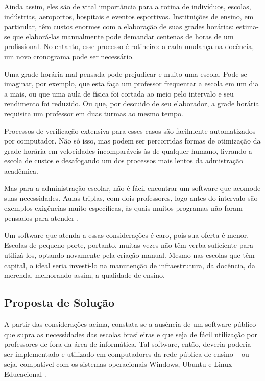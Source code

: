 \documentclass[12pt,a4paper]{article}
\begin{document}
			\par Ainda assim, eles são de vital importância para a rotina de indivíduos, escolas, indústrias, aeroportos, hospitais e eventos esportivos. Instituições de ensino, em particular, têm custos enormes com a elaboração de suas grades horárias: estima-se que elaborá-las manualmente pode demandar centenas de horas \cite{appleby} de um profissional. No entanto, esse processo é rotineiro: a cada mudança na docência, um novo cronograma pode ser necessário.

			\par Uma grade horária mal-pensada pode prejudicar e muito uma escola. Pode-se imaginar, por exemplo, que esta faça um professor frequentar a escola em um dia a mais, ou que uma aula de física foi cortada ao meio pelo intervalo e seu rendimento foi reduzido. Ou que, por descuido de seu elaborador, a grade horária requisita um professor em duas turmas ao mesmo tempo.

			\par Processos de verificação extensiva para esses casos são facilmente automatizados por computador. Não só isso, mas podem ser percorridas formas de otimização da grade horária em velocidades incomparáveis às de qualquer humano, livrando a escola de custos e desafogando um dos processos mais lentos da admistração acadêmica.

			\par Mas para a administração escolar, não é fácil encontrar um software que acomode suas necessidades. Aulas triplas, com dois professores, logo antes do intervalo são exemplos exigências muito específicas, às quais muitos programas não foram pensados para atender \cite{nikita}.

			\par Um software que atenda a essas considerações é caro, pois sua oferta é menor. Escolas de pequeno porte, portanto, muitas vezes não têm verba suficiente para utilizá-los, optando novamente pela criação manual. Mesmo nas escolas que têm capital, o ideal seria investí-lo na manutenção de infraestrutura, da docência, da merenda, melhorando assim, a qualidade de ensino.

		\subsection{Proposta de Solução}

			 \par A partir das considerações acima, constata-se a ausência de um software público \cite{publico} que supra as necessidades das escolas brasileiras e que seja de fácil utilização por professores de fora da área de informática. Tal software, então, deveria poderia ser implementado e utilizado em computadores da rede pública de ensino -- ou seja, compatível com os sistemas operacionais Windows, Ubuntu e Linux Educacional \cite{proinfo}.
\end{document}
